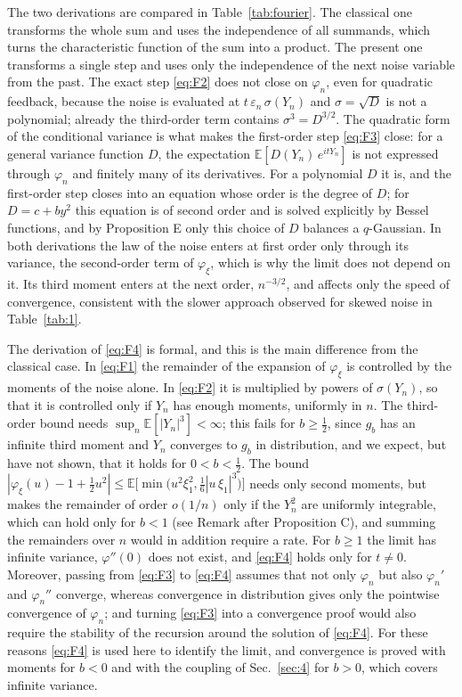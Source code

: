 \documentclass[aip,jmp,preprint,onecolumn,floatfix,superscriptaddress,nofootinbib,11pt]{revtex4-2}
\theoremstyle{plain}
\theoremstyle{remark}
\numberwithin{equation}{section}
\newcommand{\E}{\mathbb{E}}
\newcommand{\eps}{\varepsilon}
\begin{document}
The two derivations are compared in Table~\ref{tab:fourier}. The classical one transforms the whole sum and uses the independence of all summands, which turns the characteristic function of the sum into a product. The present one transforms a single step and uses only the independence of the next noise variable from the past. The exact step \eqref{eq:F2} does not close on $\varphi_n$, even for quadratic feedback, because the noise is evaluated at $t\,\eps_n\,\sigma(Y_n)$ and $\sigma=\sqrt D$ is not a polynomial; already the third-order term contains $\sigma^{3}=D^{3/2}$. The quadratic form of the conditional variance is what makes the first-order step \eqref{eq:F3} close: for a general variance function $D$, the expectation $\E[D(Y_n)\,e^{itY_n}]$ is not expressed through $\varphi_n$ and finitely many of its derivatives. For a polynomial $D$ it is, and the first-order step closes into an equation whose order is the degree of $D$; for $D=c+by^{2}$ this equation is of second order and is solved explicitly by Bessel functions, and by Proposition E only this choice of $D$ balances a $q$-Gaussian. In both derivations the law of the noise enters at first order only through its variance, the second-order term of $\varphi_\xi$, which is why the limit does not depend on it. Its third moment enters at the next order, $n^{-3/2}$, and affects only the speed of convergence, consistent with the slower approach observed for skewed noise in Table~\ref{tab:1}.

The derivation of \eqref{eq:F4} is formal, and this is the main difference from the classical case. In \eqref{eq:F1} the remainder of the expansion of $\varphi_\xi$ is controlled by the moments of the noise alone. In \eqref{eq:F2} it is multiplied by powers of $\sigma(Y_n)$, so that it is controlled only if $Y_n$ has enough moments, uniformly in $n$. The third-order bound needs $\sup_n\E[|Y_n|^{3}]<\infty$; this fails for $b\ge\tfrac12$, since $g_b$ has an infinite third moment and $Y_n$ converges to $g_b$ in distribution, and we expect, but have not shown, that it holds for $0<b<\tfrac12$. The bound $|\varphi_\xi(u)-1+\tfrac12u^{2}|\le\E\big[\min\big(u^{2}\xi_1^{2},\tfrac16|u\,\xi_1|^{3}\big)\big]$ needs only second moments, but makes the remainder of order $o(1/n)$ only if the $Y_n^{2}$ are uniformly integrable, which can hold only for $b<1$ (see Remark after Proposition C), and summing the remainders over $n$ would in addition require a rate. For $b\ge1$ the limit has infinite variance, $\varphi''(0)$ does not exist, and \eqref{eq:F4} holds only for $t\ne0$. Moreover, passing from \eqref{eq:F3} to \eqref{eq:F4} assumes that not only $\varphi_n$ but also $\varphi_n'$ and $\varphi_n''$ converge, whereas convergence in distribution gives only the pointwise convergence of $\varphi_n$; and turning \eqref{eq:F3} into a convergence proof would also require the stability of the recursion around the solution of \eqref{eq:F4}. For these reasons \eqref{eq:F4} is used here to identify the limit, and convergence is proved with moments for $b<0$ and with the coupling of Sec.~\ref{sec:4} for $b>0$, which covers infinite variance.
\end{document}
